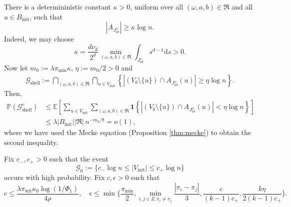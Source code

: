 \documentclass[11pt, a4paper]{amsart}
\newcommand{\1}{\mathbf{1}}
\theoremstyle{definition}
\theoremstyle{remark}
\theoremstyle{definition}
\begin{document}
There is a determininistic constant $\kappa>0$, uniform over all $(\omega,a,b) \in \mathfrak R$ and all $u \in B_{\mathrm{init}}$, such that
\[
|A_{J_{ab}^{\omega}}|\ge \kappa \log n.
\]
Indeed, we may choose
\[
\kappa=\frac{d \nu_d}{2^d} \min_{(\omega,a,b) \in \mathfrak R} \int_{J_{ab}^\omega} s^{d-1} \mathrm d s>0.
\]
Now let $m_0:=\lambda \pi_{\mathrm{min}} \kappa$, $\eta:=m_0/2>0$ and
\begin{align}
\mathcal G_{\mathrm{shell}}
:=
\bigcap_{(\omega,a,b)\in\mathfrak R}
\bigcap_{u\in V_{\mathrm{init}}}
\left\{
\left|
(V_b\setminus\{u\})
\cap A_{J_{ab}^{\omega}}(u)
\right|
\geq
\eta\log n
\right\}.
\label{eq:G-shell}
\end{align}
Then,
\begin{align*}
\mathbb P(\mathcal G_{\mathrm{shell}}^c)
&\leq
\mathbb E\left[
\sum_{u\in V_{\mathrm{init}}}
\sum_{(\omega,a,b)\in\mathfrak R}
\mathbf 1\left\{
|(V_b\setminus\{u\})
\cap A_{J_{ab}^{\omega}}(u)|
<
\eta\log n
\right\}
\right]
\\
&\leq
\lambda |B_{\mathrm{init}}|
|\mathfrak R|\,
n^{-m_0/8}
=o(1),
\end{align*}
where we have used the Mecke equation (Proposition \ref{thm:mecke}) to obtain the second inequality.

Fix $c_-,c_+>0$ such that the event
\[
\mathcal G_0:=\{c_-\log n \le|V_{\mathrm{init}}| \le c_+ \log n\}
\]
occurs with high probability. Fix $c,\epsilon>0$ such that 
\begin{equation}
\label{eq: c and eps}
c\leq \frac{\lambda\pi_{\mathrm{wit}}\kappa_0
\log(1/\Phi_1)}{4\rho},\quad \epsilon \leq \min \Big\{\frac{ \pi_{\min}}{2}, \underset{i,j \in {Z}, \pi_i \neq \pi_j}{\min}\frac{|\pi_i - \pi_j|}{3}, \frac{c}{(k-1)c_+},\frac{k\eta}{2(k-1)c_+}\Big\}.
\end{equation}
\end{document}
